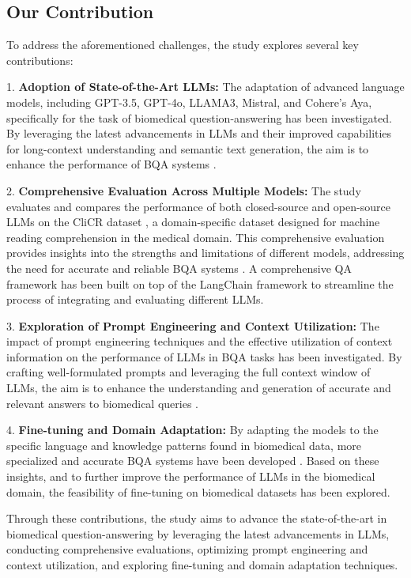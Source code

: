 \documentclass[onecolumn, conference]{IEEEtran}
\begin{document}
\subsection{Our Contribution}
To address the aforementioned challenges, the study explores several key contributions:

1. \textbf{Adoption of State-of-the-Art LLMs:} The adaptation of advanced language models, including GPT-3.5, GPT-4o, LLAMA3, Mistral, and Cohere's Aya, specifically for the task of biomedical question-answering has been investigated. By leveraging the latest advancements in LLMs and their improved capabilities for long-context understanding and semantic text generation, the aim is to enhance the performance of BQA systems \cite{Ozyurt2020} \cite{Chen2023}.

2. \textbf{Comprehensive Evaluation Across Multiple Models:} The study evaluates and compares the performance of both closed-source and open-source LLMs on the CliCR dataset \cite{Suster2018}, a domain-specific dataset designed for machine reading comprehension in the medical domain. This comprehensive evaluation provides insights into the strengths and limitations of different models, addressing the need for accurate and reliable BQA systems \cite{Soman2023} \cite{Gu2020}. A comprehensive QA framework has been built on top of the LangChain framework to streamline the process of integrating and evaluating different LLMs.

3. \textbf{Exploration of Prompt Engineering and Context Utilization:} The impact of prompt engineering techniques and the effective utilization of context information on the performance of LLMs in BQA tasks has been investigated. By crafting well-formulated prompts and leveraging the full context window of LLMs, the aim is to enhance the understanding and generation of accurate and relevant answers to biomedical queries \cite{Chen2023}.

4. \textbf{Fine-tuning and Domain Adaptation:} By adapting the models to the specific language and knowledge patterns found in biomedical data, more specialized and accurate BQA systems have been developed \cite{Jeong2020} \cite{Miolo2021}. Based on these insights, and to further improve the performance of LLMs in the biomedical domain, the feasibility of fine-tuning on biomedical datasets has been explored.

Through these contributions, the study aims to advance the state-of-the-art in biomedical question-answering by leveraging the latest advancements in LLMs, conducting comprehensive evaluations, optimizing prompt engineering and context utilization, and exploring fine-tuning and domain adaptation techniques.
\end{document}
